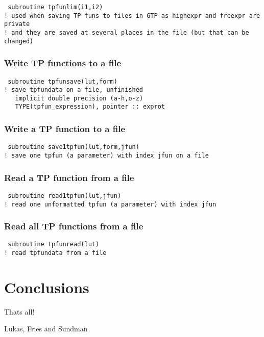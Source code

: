 \documentclass[12pt]{article}
\begin{document}
\begin{verbatim}
 subroutine tpfunlim(i1,i2)
! used when saving TP funs to files in GTP as highexpr and freexpr are private
! and they are saved at several places in the file (but that can be changed)
\end{verbatim}

\subsubsection{Write TP functions to a file}

\begin{verbatim}
 subroutine tpfunsave(lut,form)
! save tpfundata on a file, unfinished
   implicit double precision (a-h,o-z)
   TYPE(tpfun_expression), pointer :: exprot
\end{verbatim}

\subsubsection{Write a TP function to a file}

\begin{verbatim}
 subroutine save1tpfun(lut,form,jfun)
! save one tpfun (a parameter) with index jfun on a file
\end{verbatim}

\subsubsection{Read a TP function from a file}

\begin{verbatim}
 subroutine read1tpfun(lut,jfun)
! read one unformatted tpfun (a parameter) with index jfun
\end{verbatim}

\subsubsection{Read all TP functions from a file}

\begin{verbatim}
 subroutine tpfunread(lut)
! read tpfundata from a file
\end{verbatim}

\section{Conclusions}

Thats all!

\begin{thebibliography}{77Zzz}
 Lukas, Fries and Sundman
\end{thebibliography}
\end{document}
